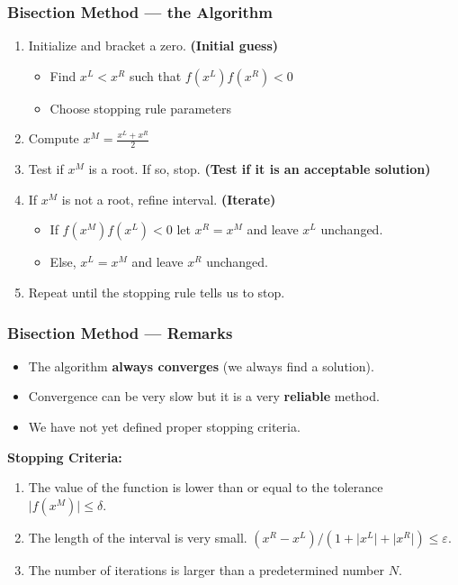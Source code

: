 \documentclass[11pt,xcolor={svgnames},aspectratio=169,usepdftitle=false,notheorems]{beamer}
\begin{document}
\begin{frame}
  \frametitle{Bisection Method --- the Algorithm}
  \begin{enumerate}
    \item Initialize and bracket a zero. {\tiny \alert{\textbf{(Initial guess)}}}
    \begin{itemize}
      \item Find $x^L < x^R$ such that $f(x^L)f(x^R) < 0$
      \item Choose stopping rule parameters
    \end{itemize}
    \item Compute $x^M = \frac{x^L + x^R}{2}$
    \item Test if $x^M$ is a root. If so, stop. {\tiny \alert{\textbf{(Test if it is an acceptable solution)}}}
    \item If $x^M$ is not a root, refine interval. {\tiny \alert{\textbf{(Iterate)}}}
    \begin{itemize}
      \item If $f(x^M)f(x^L) < 0$ let $x^R = x^M$ and leave $x^L$ unchanged.
      \item Else, $x^L = x^M$ and leave $x^R$ unchanged.
    \end{itemize}
    \item Repeat until the stopping rule tells us to stop.
  \end{enumerate}
\end{frame}

\begin{frame}
  \frametitle{Bisection Method --- Remarks}
\begin{itemize}
  \item The algorithm \alert{\textbf{always converges}} (we always find a solution).
  \item Convergence can be very slow but it is a very \alert{\textbf{reliable}} method.
  \item We have not yet defined proper stopping criteria.
\end{itemize}
\alert{\textbf{Stopping Criteria:}}
\begin{enumerate}
  \item The value of the function is lower than or equal to the tolerance $\lvert f(x^M) \rvert \leq \delta$.
  \item The length of the interval is very small. $(x^R - x^L) / (1 + \lvert x^L \rvert + \lvert x^R \rvert) \leq \varepsilon$.
  \item The number of iterations is larger than a predetermined number $N$.
\end{enumerate}
\end{frame}
\end{document}
